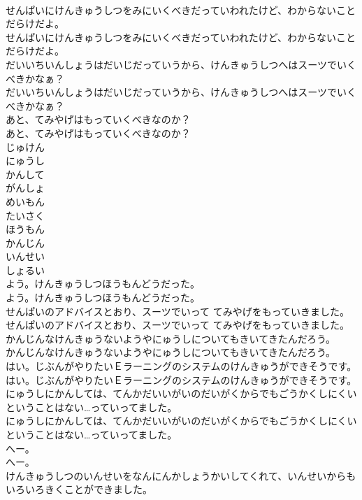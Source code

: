 \documentclass[8pt]{extreport}
\begin{document}
\begin{CJK}{UTF8}{min}
\\	せんぱいにけんきゅうしつをみにいくべきだっていわれたけど、わからないことだらけだよ。	
\\	せんぱいにけんきゅうしつをみにいくべきだっていわれたけど、わからないことだらけだよ。 
\\	だいいちいんしょうはだいじだっていうから、けんきゅうしつへはスーツでいくべきかなぁ？	
\\	だいいちいんしょうはだいじだっていうから、けんきゅうしつへはスーツでいくべきかなぁ？ 
\\	あと、てみやげはもっていくべきなのか？	
\\	あと、てみやげはもっていくべきなのか？ 
\\	じゅけん
\\	にゅうし
\\	かんして
\\	がんしょ
\\	めいもん
\\	たいさく
\\	ほうもん
\\	かんじん
\\	いんせい
\\	しょるい
\\	よう。けんきゅうしつほうもんどうだった。	
\\	よう。けんきゅうしつほうもんどうだった。 
\\	せんぱいのアドバイスとおり、スーツでいって てみやげをもっていきました。	
\\	せんぱいのアドバイスとおり、スーツでいって てみやげをもっていきました。 
\\	かんじんなけんきゅうないようやにゅうしについてもきいてきたんだろう。	
\\	かんじんなけんきゅうないようやにゅうしについてもきいてきたんだろう。 
\\	はい。じぶんがやりたいＥラーニングのシステムのけんきゅうができそうです。	
\\	はい。じぶんがやりたいＥラーニングのシステムのけんきゅうができそうです。 
\\	にゅうしにかんしては、てんかだいいがいのだいがくからでもごうかくしにくいということはない…っていってました。	
\\	にゅうしにかんしては、てんかだいいがいのだいがくからでもごうかくしにくいということはない…っていってました。 
\\	へー。	
\\	へー。 
\\	けんきゅうしつのいんせいをなんにんかしょうかいしてくれて、いんせいからもいろいろきくことができました。	

\end{CJK}
\end{document}
